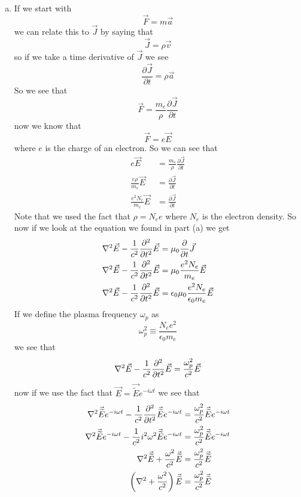 \documentclass[11pt]{article}
\numberwithin{equation}{section}
\newcommand{\grad}{\bold\nabla}
\begin{document}
\begin{enumerate}[(a)]
\item
If we start with 
$$\vec{F} = m\vec{a}$$
we can relate this to $\vec{J}$ by saying that
$$\vec{J} = \rho\vec{v}$$
so if we take a time derivative of $\vec{J}$ we see
$$\frac{\partial\vec{J}}{\partial t} = \rho\vec{a}$$
So we see that 
$$\vec{F} = \frac{m_e}{\rho}\frac{\partial\vec{J}}{\partial t}$$
now we know that 
$$\vec{F} = e\vec{E}$$
where $e$ is the charge of an electron. So we can see that
\begin{align*}
e\vec{E} &= \frac{m_e}{\rho}\frac{\partial\vec{J}}{\partial t}\\
\frac{e\rho}{m_e}\vec{E} &= \frac{\partial\vec{J}}{\partial t}\\
\frac{e^2N_e}{m_e}\vec{E} &= \frac{\partial\vec{J}}{\partial t}
\end{align*}
Note that we used the fact that $\rho = N_e e$ where $N_e$ is the electron density. So now if we look at the equation we found in part (a) we get
\begin{align*}
\grad^2\vec{E} - \frac{1}{c^2}\frac{\partial^2}{\partial t^2}\vec{E} &= \mu_0\frac{\partial}{\partial t}\vec{J}\\
\grad^2\vec{E} - \frac{1}{c^2}\frac{\partial^2}{\partial t^2}\vec{E} &= \mu_0\frac{e^2N_e}{m_e}\vec{E}\\
\grad^2\vec{E} - \frac{1}{c^2}\frac{\partial^2}{\partial t^2}\vec{E} &= \epsilon_0\mu_0\frac{e^2N_e}{\epsilon_0m_e}\vec{E}
\end{align*}
If we define the plasma frequency $\omega_p$ as
$$\omega_p^2\equiv\frac{N_ee^2}{\epsilon_0m_e}$$ 
we see that 
$$\grad^2\vec{E} - \frac{1}{c^2}\frac{\partial^2}{\partial t^2}\vec{E} = \frac{\omega_p^2}{c^2}\vec{E}$$
now if we use the fact that $\vec{E} = \vec{\widetilde{E}}e^{-i\omega t}$ we see that 
\begin{align*}
\grad^2\vec{\widetilde{E}}e^{-i\omega t} - \frac{1}{c^2}\frac{\partial^2}{\partial t^2}\vec{\widetilde{E}}e^{-i\omega t} &= \frac{\omega_p^2}{c^2}\vec{\widetilde{E}}e^{-i\omega t}\\
\grad^2\vec{\widetilde{E}}e^{-i\omega t} - \frac{1}{c^2}i^2\omega^2\vec{\widetilde{E}}e^{-i\omega t} &= \frac{\omega_p^2}{c^2}\vec{\widetilde{E}}e^{-i\omega t}\\
\grad^2\vec{\widetilde{E}} + \frac{\omega^2}{c^2}\vec{\widetilde{E}} &= \frac{\omega_p^2}{c^2}\vec{\widetilde{E}}\\
\left(\grad^2 + \frac{\omega^2}{c^2}\right)\vec{\widetilde{E}} &= \frac{\omega_p^2}{c^2}\vec{\widetilde{E}}
\end{align*}


\end{enumerate}
\end{document}
